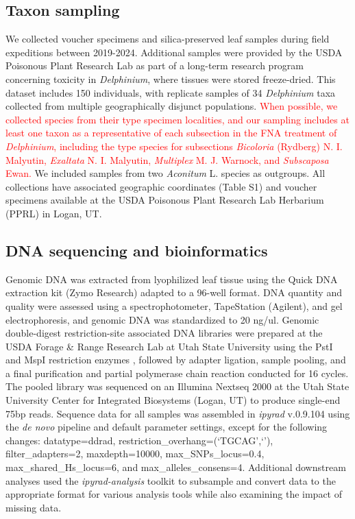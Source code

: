 \documentclass[11pt]{article}
\begin{document}
\subsection{Taxon sampling}
We collected voucher specimens and silica-preserved leaf samples during field expeditions
between 2019-2024. Additional samples were provided by the USDA Poisonous Plant Research
Lab as part of a long-term research program concerning toxicity in \emph{Delphinium}, where
tissues were stored freeze-dried.
% 
This dataset includes 150 individuals, with replicate samples of 34 \emph{Delphinium} 
taxa collected from multiple geographically disjunct populations. \textcolor{red}{When possible, we collected species from their type specimen localities, and our sampling includes
at least one taxon as a representative of each subsection in the FNA treatment of
\emph{Delphinium}, including the type species for subsections \emph{Bicoloria} (Rydberg) N. I. Malyutin, \emph{Exaltata} 
N. I. Malyutin, \emph{Multiplex} M. J. Warnock, and \emph{Subscaposa} Ewan.}
We included samples from two \emph{Aconitum} L. species as outgroups.
All collections have associated geographic coordinates (Table S1) and voucher 
specimens available at the USDA Poisonous Plant Research Lab Herbarium (PPRL)
in Logan, UT.

\subsection{DNA sequencing and bioinformatics}
Genomic DNA was extracted from lyophilized leaf tissue using the Quick DNA
extraction kit (Zymo Research) adapted to a 96-well format. 
DNA quantity and quality were assessed using a spectrophotometer, TapeStation 
(Agilent), and gel electrophoresis, and genomic DNA was standardized to 20 ng/ul. 
% 
Genomic double-digest restriction-site associated DNA \citep[ddRAD-seq;][]{peterson_double_2012}
libraries were prepared at the USDA Forage \& Range Research Lab at 
Utah State University using the PstI and MspI restriction enzymes
\citep{poland_development_2012},
followed by adapter ligation, sample pooling, and a final purification
and partial polymerase chain reaction conducted for 16 cycles. 
% 
The pooled library was sequenced on an Illumina Nextseq 2000 at the Utah State 
University Center for Integrated Biosystems (Logan, UT) to produce single-end
75bp reads. 
% 
Sequence data for all samples was assembled in \emph{ipyrad} 
v.0.9.104 \citep{eaton_ipyrad_2020} using the \emph{de novo} 
pipeline and default parameter settings, except for the following
changes: datatype=ddrad, restriction\_overhang=(`TGCAG',`'),
filter\_adapters=2, maxdepth=10000, max\_SNPs\_locus=0.4,
max\_shared\_Hs\_locus=6, and max\_alleles\_consens=4. 
% 
Additional downstream analyses 
used the \emph{ipyrad-analysis} toolkit to subsample and convert data to the
appropriate format for various analysis tools while also examining the impact of
missing data.
\end{document}
